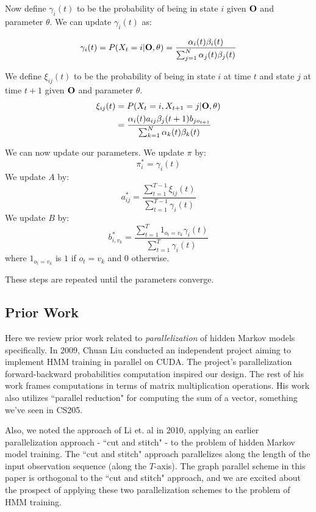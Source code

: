 Now define $\gamma_i(t)$ to be the probability of being in state $i$ given $\bold{O}$ and parameter $\theta$. We can update $\gamma_i(t)$ as:

\begin{equation} \label{gamma}
\gamma_i(t) = P(X_t = i | \bold{O}, \theta) = \frac{\alpha_i(t) \beta_i(t)}{\sum_{j=1}^N \alpha_j(t) \beta_j(t)}
\end{equation}

We define $\xi_{ij}(t)$ to be the probability of being in state $i$ at time $t$ and state $j$ at time $t+1$ given $\bold{O}$ and parameter $\theta$. 
\begin{equation}\label{xi}
\begin{aligned}
\xi_{ij}(t) &= P(X_t = i, X_{t+1} = j | \bold{O}, \theta)  \\
&=\frac{\alpha_i(t) a_{ij} \beta_j(t+1)b_{jo_{t+1}}}{\sum_{k=1}^N \alpha_k(t) \beta_k(t)}
\end{aligned}
\end{equation}

We can now update our parameters. We update $\pi$ by:
\begin{equation}\label{pi}
\pi_i^* = \gamma_i(t)
\end{equation}
We update $A$ by:
\begin{equation}\label{a}
a^*_{ij} = \frac{\sum_{t=1}^{T-1}\xi_{ij}(t)}{\sum_{t=1}^{T-1}\gamma_i(t)}
\end{equation}
We update $B$ by:
\begin{equation}\label{b}
b^*_{i,v_k} = \frac{\sum_{t=1}^{T}1_{o_t = v_k} \gamma_i(t)}{\sum_{t=1}^T \gamma_i(t)}
\end{equation}
where $1_{o_t = v_k}$ is $1$ if $o_t = v_k$ and $0$ otherwise. 

These steps are repeated until the parameters converge. 

\subsection{Prior Work}

Here we review prior work related to \textit{parallelization} of hidden Markov models specifically.  In 2009, Chuan Liu conducted an independent project aiming to implement HMM training in parallel on CUDA.  The project's parallelization forward-backward probabilities computation inspired our design.  The rest of his work frames computations in terms of matrix multiplication operations.  His work also utilizes ``parallel reduction" for computing the sum of a vector, something we've seen in CS205.  \cite{cuda-hmm}

Also, we noted the approach of Li et. al in 2010, applying an earlier parallelization approach - ``cut and stitch" - to the problem of hidden Markov model training.  The ``cut and stitch" approach parallelizes along the length of the input observation sequence (along the $T$-axis).  The graph parallel scheme in this paper is orthogonal to the ``cut and stitch" approach, and we are excited about the prospect of applying these two parallelization schemes to the problem of HMM training. \cite{cut-stitch}